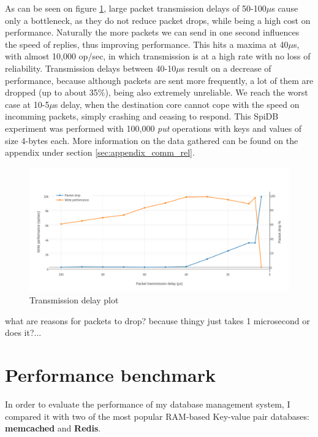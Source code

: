 As can be seen on figure \ref{fig:transmission-delay}, large packet transmission delays of 50-100$\mu$s cause only a bottleneck, as they do not reduce packet drops, while being a high cost on performance. Naturally the more packets we can send in one second influences the speed of replies, thus improving performance. This hits a maxima at 40$\mu$s, with almost 10,000 op/sec, in which transmission is at a high rate with no loss of reliability. Transmission delays between 40-10$\mu$s result on a decrease of performance, because although packets are sent more frequently, a lot of them are dropped (up to about 35\%), being also extremely unreliable. We reach the worst case at 10-5$\mu$s delay, when the destination core cannot cope with the speed on incomming packets, simply crashing and ceasing to respond. This SpiDB experiment was performed with 100,000 \textit{put} operations with keys and values of size 4-bytes each. More information on the data gathered can be found on the appendix under section \ref{sec:appendix_comm_rel}.

\begin{figure}
\begin{center}
	\includegraphics[width=1.4\textwidth, natwidth=1063, natheight=509]{images/transmission_delay.png}
\end{center}
\caption{Transmission delay plot}
\label{fig:transmission-delay}
\end{figure}

what are reasons for packets to drop? because thingy just takes 1 microsecond or does it?...

\section{Performance benchmark}

In order to evaluate the performance of my database management system, I compared it with two of the most popular RAM-based Key-value pair databases: \textbf{memcached} and \textbf{Redis}.

